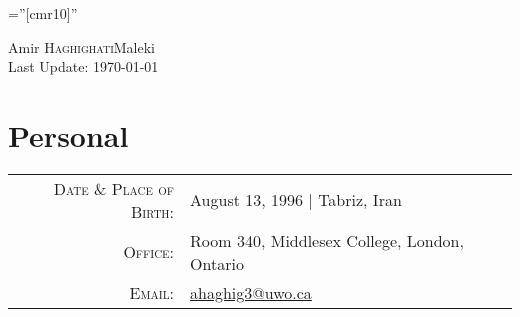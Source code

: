 \documentclass[a4paper,10pt]{article}
\begin{document}
\font\fb=''[cmr10]'' %

\par{\centering
		{\Huge Amir \textsc{Haghighati}Maleki\\
		\small{Last Update: \today}
		}
	\bigskip\par
}
\section{Personal}

\begin{tabular}{rl}
    \textsc{Date \& Place of Birth:} & August 13, 1996 | Tabriz, Iran \\
    \textsc{Office:}   & Room 340, Middlesex College, London, Ontario \\
    \textsc{Email:}     & \href{mailto:ahaghig3@uwo.ca}{ahaghig3@uwo.ca} \\
\end{tabular}

\end{document}
